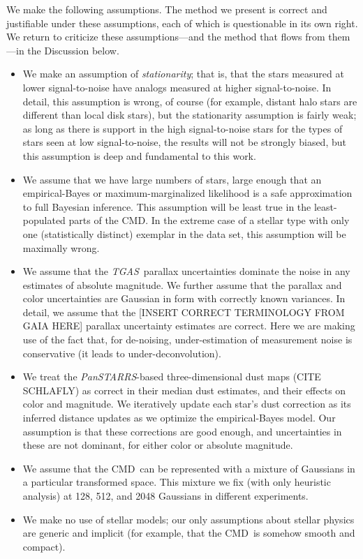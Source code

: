 \documentclass[modern]{aastex61}
\newcommand{\acronym}[1]{{\small{#1}}}
\newcommand{\project}[1]{\textsl{#1}}
\newcommand{\tgas}{\project{\acronym{TGAS}}}
\newcommand{\panstarrs}{\project{Pan\acronym{STARRS}}}
\newcommand{\cmd}{\acronym{CMD}}
\begin{document}
We make the following assumptions. The method we present is correct
and justifiable under these assumptions, each of which is questionable
in its own right. We return to criticize these assumptions---and the
method that flows from them---in the Discussion below.
\begin{itemize}
\item We make an assumption of \emph{stationarity}; that is, that the
  stars measured at lower signal-to-noise have analogs measured at
  higher signal-to-noise.  In detail, this assumption is wrong, of
  course (for example, distant halo stars are different than local
  disk stars), but the stationarity assumption is fairly weak; as long
  as there is support in the high signal-to-noise stars for the types
  of stars seen at low signal-to-noise, the results will not be
  strongly biased, but this assumption is deep and fundamental to this
  work.
\item We assume that we have large numbers of stars, large enough that
  an empirical-Bayes or maximum-marginalized likelihood is a safe
  approximation to full Bayesian inference. This assumption will be
  least true in the least-populated parts of the \cmd. In the extreme
  case of a stellar type with only one (statistically distinct)
  exemplar in the data set, this assumption will be maximally wrong.
\item We assume that the \tgas\ parallax uncertainties dominate the
  noise in any estimates of absolute magnitude. We further assume that
  the parallax and color uncertainties are Gaussian in form with
  correctly known variances. In detail, we assume that the [INSERT
    CORRECT TERMINOLOGY FROM GAIA HERE] parallax uncertainty estimates
  are correct. Here we are making use of the fact that, for
  de-noising, under-estimation of measurement noise is conservative
  (it leads to under-deconvolution).
\item We treat the \panstarrs-based three-dimensional dust maps (CITE
  SCHLAFLY) as correct in their median dust estimates, and their
  effects on color and magnitude. We iteratively update each star's
  dust correction as its inferred distance updates as we optimize the
  empirical-Bayes model. Our assumption is that these corrections are
  good enough, and uncertainties in these are not dominant, for either
  color or absolute magnitude.
\item We assume that the \cmd\ can be represented with a mixture of
  Gaussians in a particular transformed space. This mixture we fix
  (with only heuristic analysis) at 128, 512, and 2048 Gaussians in
  different experiments.
\item We make no use of stellar models; our only assumptions about
  stellar physics are generic and implicit (for example, that the
  \cmd\ is somehow smooth and compact).
\end{itemize}
\end{document}
